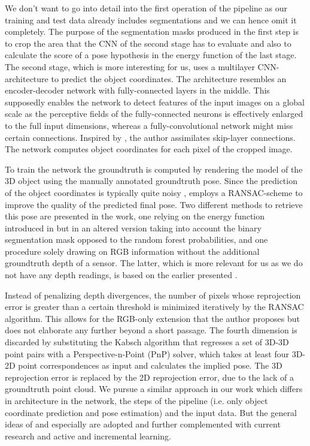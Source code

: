 We don’t want to go into detail into the first operation of the pipeline as our training and test data already includes segmentations and we can hence omit it completely. The purpose of the segmentation masks produced in the first step is to crop the area that the CNN of the second stage has to evaluate and also to calculate the score of a pose hypothesis in the energy function of the last stage. The second stage, which is more interesting for us, uses a multilayer CNN-architecture to predict the object coordinates. The architecture resembles an encoder-decoder network with fully-connected layers in the middle. This supposedly enables the network to detect features of the input images on a global scale as the perceptive fields of the fully-connected neurons is effectively enlarged to the full input dimensions, whereas a fully-convolutional network might miss certain connections. Inspired by \cite{oronneberger}, the author assimilates skip-layer connections. The network computes object coordinates for each pixel of the cropped image. 

To train the network the groundtruth is computed by rendering the model of the 3D object using the manually annotated groundtruth pose. Since the prediction of the object coordinates is typically quite noisy \cite{bb8}, \cite{pertsch} employs a RANSAC-scheme to improve the quality of the predicted final pose. Two different methods to retrieve this pose are presented in the work, one relying on the energy function introduced in \cite{brachmann1} but in an altered version taking into account the binary segmentation mask opposed to the random forest probabilities, and one procedure solely drawing on RGB information without the additional groundtruth depth of a sensor. The latter, which is more relevant for us as we do not have any depth readings, is based on the earlier presented \cite{brachmann2}. 

Instead of penalizing depth divergences, the number of pixels whose reprojection error is greater than a certain threshold is minimized iteratively by the RANSAC algorithm. This allows for the RGB-only extension that the author proposes but does not elaborate any further beyond a short passage. The fourth dimension is discarded by substituting the Kabsch algorithm that regresses a set of 3D-3D point pairs with a Perspective-n-Point (PnP) solver, which takes at least four 3D-2D point correspondences as input and calculates the implied pose. The 3D reprojection error is replaced by the 2D reprojection error, due to the lack of a groundtruth point cloud. We pursue a similar approach in our work which differs in architecture in the network, the steps of the pipeline (i.e. only object coordinate prediction and pose estimation) and the input data. But the general ideas of \cite{pertsch} and especially \cite{brachmann1} are adopted and further complemented with current research and active and incremental learning.

